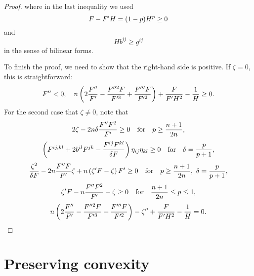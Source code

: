 \documentclass{amsart}
\begin{document}
\begin{proof}
where in the last inequality we used
$$F-F'H=(1-p)H^p\geq 0$$
and
$$Hb^{ij}\geq g^{ij}$$
in the sense of bilinear forms.

To finish the proof, we need to show that the right-hand side is positive. If $\zeta=0$, this is straightforward:
\[F''<0,\quad n\left(2\frac{F''}{F'}-\frac{F''^{2}F}{F'^{3}}+\frac{F'''F}{F'^{2}}\right)+\frac{F}{F'H^2}-\frac{1}{H}\geq 0.\]
For the second case that $\zeta\neq 0$, note that
$$2\zeta-2n\delta\frac{F''F^2}{F'}\geq 0\quad\mbox{for}\quad p\geq \frac{n+1}{2n},$$
$$\left(F^{ij,kl}+2b^{il}F^{jk}-\frac{F^{ij}F^{kl}}{\delta F}\right)\eta_{ij}\eta_{kl}\geq0\quad\mbox{for}\quad\delta=\frac{p}{p+1},$$
$$\frac{\zeta^2}{\delta F}-2n\frac{F''F}{F'}\zeta+n\left(\zeta'F-\zeta\right)F'\geq 0\quad\mbox{for}\quad p\geq\frac{n+1}{2n},~\delta=\frac{p}{p+1},$$
$$\zeta'F-n\frac{F''F^2}{F'}-\zeta\geq 0\quad\mbox{for}\quad\frac{n+1}{2n}\leq p\leq 1,$$
$$n\left(2\frac{F''}{F'}-\frac{F''^{2}F}{F'^{3}}+\frac{F'''F}{F'^{2}}\right)-\zeta''+\frac{F}{F'H^2}-\frac{1}{H}=0.$$
\end{proof}

\section{Preserving convexity}
\label{sec:convexity}
\end{document}
